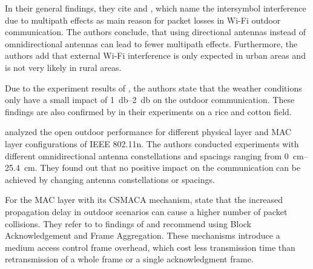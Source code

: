 In their general findings, they cite \cite{sheth_packet_2007} and \cite{aguayo_link-level_2004}, which name the intersymbol
interference due to multipath effects as main reason for packet losses in Wi-Fi outdoor communication. The authors conclude,
that using directional antennas instead of omnidirectional antennas can lead to fewer multipath effects. Furthermore, the authors add
that external Wi-Fi interference is only expected in urban areas and is not very likely in rural areas.

Due to the experiment results of \cite{chebrolu_long-distance_2006}, the authors state that the weather conditions only have a
small impact of \SIrange{1}{2}{\decibel} on the outdoor communication. These findings are also confirmed by \cite{brinkhoff_characterization_2017}
in their experiments on a rice and cotton field.

\textcite{paul_characterizing_2011} analyzed the open outdoor performance for different physical layer and MAC layer configurations of
IEEE 802.11n. The authors conducted experiments with different omnidirectional antenna constellations and spacings ranging from
\SIrange{0}{25.4}{\centi\metre}. They found out that no positive impact on the communication can be achieved by
changing antenna constellations or spacings.

For the MAC layer with its \ac{CSMACA} mechanism,\textcite{aust_outdoor_2015} state that the increased propagation delay in outdoor scenarios
can cause a higher number of packet collisions. They refer to to findings of \cite{paul_characterizing_2011} and recommend
using Block Acknowledgement and Frame Aggregation. These mechanisms introduce a medium access control frame overhead, which cost less transmission time than
retransmission of a whole frame or a single acknowledgment frame.

